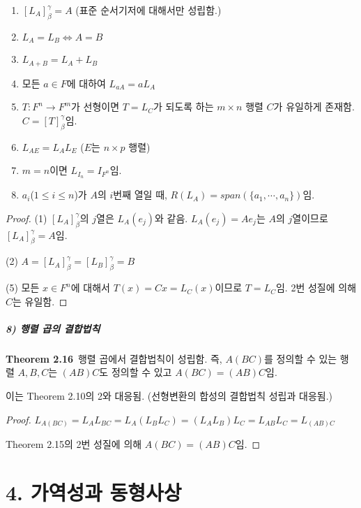 \begin{enumerate}
    \item $[L_A]_{\beta}^{\gamma}=A$ (표준 순서기저에 대해서만 성립함.)
    \item $L_A=L_B \Longleftrightarrow A=B$
    \item $L_{A+B}=L_A+L_B$
    \item 모든 $a \in F$에 대하여 $L_{aA}=aL_A$
    \item $T:F^n \rightarrow F^m$가 선형이면 $T=L_C$가 되도록 하는 $m \times n$ 행렬 $C$가 유일하게 존재함. $C=[T]_{\beta}^{\gamma}$임.
    \item $L_{AE}=L_{A}L_{E}$ ($E$는 $n \times p$ 행렬)
    \item $m=n$이면 $L_{I_n}=I_{F^n}$임.
    \item $a_i$($1 \leq i \leq n$)가 $A$의 $i$번째 열일 때, $R(L_A)=span(\{a_1, \cdots ,a_n\})$임.
\end{enumerate}

\begin{proof}
    (1) $[L_A]_{\beta}^{\gamma}$의 $j$열은 $L_A(e_j)$와 같음. $L_A(e_j)=Ae_j$는 $A$의 $j$열이므로 $[L_A]_{\beta}^{\gamma}=A$임.
    
    (2) $A=[L_A]_{\beta}^{\gamma}=[L_B]_{\beta}^{\gamma}=B$
    
    (5) 모든 $x \in F^n$에 대해서 $T(x)=Cx=L_C(x)$이므로 $T=L_C$임. 2번 성질에 의해 $C$는 유일함.
\end{proof}

\subsubsection*{8) 행렬 곱의 결합법칙}
\textbf{Theorem 2.16}\, 행렬 곱에서 결합법칙이 성립함. 즉, $A(BC)$를 정의할 수 있는 행렬 $A,B,C$는 $(AB)C$도 정의할 수 있고 $A(BC)=(AB)C$임.

이는 Theorem 2.10의 2와 대응됨. (선형변환의 합성의 결합법칙 성립과 대응됨.)

\begin{proof}
$L_{A(BC)}=L_{A}L_{BC}=L_{A}(L_{B}L_{C})=(L_{A}L_{B})L_{C}=L_{AB}L_{C}=L_{(AB)C}$

Theorem 2.15의 2번 성질에 의해 $A(BC)=(AB)C$임.
\end{proof}


\newpage


\part*{4. 가역성과 동형사상}

